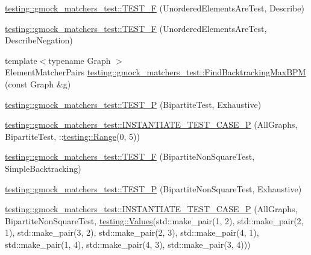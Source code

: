 \begin{DoxyCompactItemize}
\item 
\mbox{\hyperlink{namespacetesting_1_1gmock__matchers__test_a937f4d835023cd6322eb7d32596f3f43}{testing\+::gmock\+\_\+matchers\+\_\+test\+::\+T\+E\+S\+T\+\_\+F}} (Unordered\+Elements\+Are\+Test, Describe)
\item 
\mbox{\hyperlink{namespacetesting_1_1gmock__matchers__test_a3c4c92b68a08c5d541e46ed367e216ab}{testing\+::gmock\+\_\+matchers\+\_\+test\+::\+T\+E\+S\+T\+\_\+F}} (Unordered\+Elements\+Are\+Test, Describe\+Negation)
\item 
{\footnotesize template$<$typename Graph $>$ }\\Element\+Matcher\+Pairs \mbox{\hyperlink{namespacetesting_1_1gmock__matchers__test_a09321a8d4a4c40ab1e369fbdf92b0414}{testing\+::gmock\+\_\+matchers\+\_\+test\+::\+Find\+Backtracking\+Max\+B\+PM}} (const Graph \&g)
\item 
\mbox{\hyperlink{namespacetesting_1_1gmock__matchers__test_a20589d957fcfe5399e249084dbc23e82}{testing\+::gmock\+\_\+matchers\+\_\+test\+::\+T\+E\+S\+T\+\_\+P}} (Bipartite\+Test, Exhaustive)
\item 
\mbox{\hyperlink{namespacetesting_1_1gmock__matchers__test_a16ff96ce4f97da6215f889baccd57e87}{testing\+::gmock\+\_\+matchers\+\_\+test\+::\+I\+N\+S\+T\+A\+N\+T\+I\+A\+T\+E\+\_\+\+T\+E\+S\+T\+\_\+\+C\+A\+S\+E\+\_\+P}} (All\+Graphs, Bipartite\+Test, \+::\mbox{\hyperlink{namespacetesting_a4f2c9978ad0c764f57e0cbd6f72cb540}{testing\+::\+Range}}(0, 5))
\item 
\mbox{\hyperlink{namespacetesting_1_1gmock__matchers__test_a7d2395b1cb6a90bdc8d46ae06f99f6c7}{testing\+::gmock\+\_\+matchers\+\_\+test\+::\+T\+E\+S\+T\+\_\+F}} (Bipartite\+Non\+Square\+Test, Simple\+Backtracking)
\item 
\mbox{\hyperlink{namespacetesting_1_1gmock__matchers__test_a3ac913ed55a7ac2636ae7bfce04296e9}{testing\+::gmock\+\_\+matchers\+\_\+test\+::\+T\+E\+S\+T\+\_\+P}} (Bipartite\+Non\+Square\+Test, Exhaustive)
\item 
\mbox{\hyperlink{namespacetesting_1_1gmock__matchers__test_a64ef722e930c3088ddea704ac20194b5}{testing\+::gmock\+\_\+matchers\+\_\+test\+::\+I\+N\+S\+T\+A\+N\+T\+I\+A\+T\+E\+\_\+\+T\+E\+S\+T\+\_\+\+C\+A\+S\+E\+\_\+P}} (All\+Graphs, Bipartite\+Non\+Square\+Test, \mbox{\hyperlink{namespacetesting_abd3c87b40c2a0663691c9b617ed5fcc2}{testing\+::\+Values}}(std\+::make\+\_\+pair(1, 2), std\+::make\+\_\+pair(2, 1), std\+::make\+\_\+pair(3, 2), std\+::make\+\_\+pair(2, 3), std\+::make\+\_\+pair(4, 1), std\+::make\+\_\+pair(1, 4), std\+::make\+\_\+pair(4, 3), std\+::make\+\_\+pair(3, 4)))

\end{DoxyCompactItemize}
